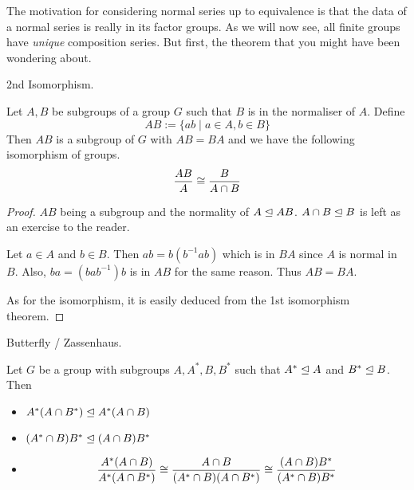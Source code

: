 \documentclass[../../book.tex]{subfiles}
\begin{document}
\begin{rmk}
    
    The motivation for considering normal series up to equivalence is that
    the data of a normal series is really in its factor groups.
    As we will now see, all finite groups have \emph{unique} composition series.
    But first, the theorem that you might have been wondering about.
    
\end{rmk}
\begin{thm} 2nd Isomorphism.
    
    Let $A, B$ be subgroups of a group $G$ such that
    $B$ is in the normaliser of $A$. 
    Define \[
        AB := \{ ab \mid a \in A, b \in B\}
    \]
    Then $AB$ is a subgroup of $G$ with $AB = BA$
    and we have the following isomorphism of groups. 
    \[
            \frac{AB}{A} \cong \frac{B}{A \cap B}
    \]
    
\end{thm}
\begin{proof}
    
    $AB$ being a subgroup and 
    the normality of $A \trianglelefteq AB$. $A \cap B \trianglelefteq B$
    is left as an exercise to the reader.
    
    Let $a \in A$ and $b \in B$. 
    Then $ab = b (b^{-1}ab)$ which is in $BA$ since $A$ is normal in $B$. 
    Also, $ba = (bab^{-1}) b$ is in $AB$ for the same reason.
    Thus $AB = BA$. 
    
    As for the isomorphism, it is easily deduced from the 1st isomorphism theorem.
    
\end{proof}
\begin{lem} Butterfly / Zassenhaus.
    
    Let $G$ be a group with subgroups $A, A^*, B, B^*$ such that 
    $A^* \trianglelefteq A$ and $B^* \trianglelefteq B$. 
    Then \begin{itemize}
        \item $A^* (A \cap B^*) \trianglelefteq A^* (A \cap B)$
        \item $(A^* \cap B) B^* \trianglelefteq (A \cap B) B^*$
        \item \[
            \frac {A^* (A \cap B)}{A^* (A \cap B^*)}
            \cong \frac{A \cap B}{(A^* \cap B)(A \cap B^*)}
            \cong \frac{(A \cap B)B^*}{(A^*\cap B)B^*}
        \]
    \end{itemize}
\end{lem}
\end{document}
